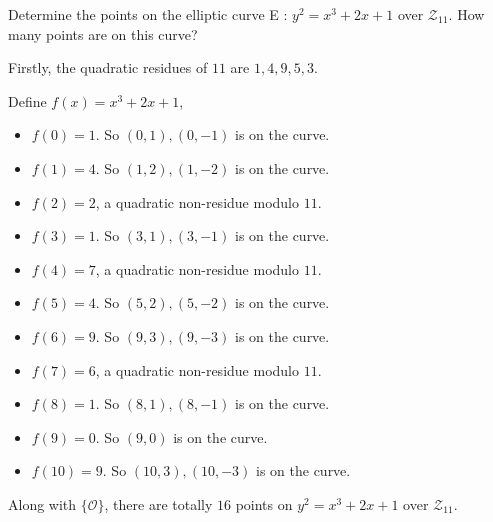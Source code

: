 \documentclass[a4paper]{article}
\newcommand{\Z}{\mathcal{Z}}
\newenvironment{problem}[2][Problem]{\begin{trivlist}
\item[\hskip \labelsep {\bfseries #1}\hskip \labelsep {\bfseries #2.}]}{\end{trivlist}}
\begin{document}
\begin{problem}{8.16}
Determine the points on the elliptic curve E : $y^2=x^3+2x+1$ over $\Z_{11}$. How many points are on this curve?

Firstly, the quadratic residues of $11$ are $1,4,9,5,3$.\par
Define $f(x)=x^3+2x+1$, 
\begin{itemize}
    \item $f(0)=1.$ So $(0,1),(0,-1)$ is on the curve.
    \item $f(1)=4$. So $(1,2),(1,-2)$ is on the curve.
    \item $f(2)=2$, a quadratic non-residue modulo $11$.
    \item $f(3)=1$. So $(3,1),(3,-1)$ is on the curve.
    \item $f(4)=7$, a quadratic non-residue modulo $11$.
    \item $f(5)=4$. So $(5,2),(5,-2)$ is on the curve.
    \item $f(6)=9$. So $(9,3),(9,-3)$ is on the curve.
    \item $f(7)=6$, a quadratic non-residue modulo $11$.
    \item $f(8)=1$. So $(8,1),(8,-1)$ is on the curve.
    \item $f(9)=0$. So $(9,0)$ is on the curve.
    \item $f(10)=9$. So $(10,3),(10,-3)$ is on the curve.
\end{itemize}
Along with $\{\mathcal{O}\}$, there are totally $16$ points on $y^2=x^3+2x+1$ over $\Z_{11}$. 
\end{problem}
\end{document}
